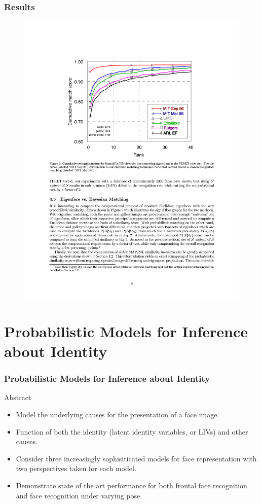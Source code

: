 \documentclass{beamer}
\begin{document}
\begin{frame}
\frametitle{Results}
\begin{figure}[H]
\centering
\includegraphics[height=\textheight, trim=1.6in 4.9in 1.6in 1.4in, clip]{Moghaddam11}
\end{figure}
\end{frame}

\section{Probabilistic Models for Inference about Identity}
\begin{frame}
\frametitle{Probabilistic Models for Inference about Identity}
\begin{block}{Abstract}
\begin{itemize}
\item Model the underlying causes for the presentation of a face image.
\pause
\item Function of both the identity (latent identity variables, or LIVs) and other causes.
\pause
\item Consider three increasingly sophisiticated models for face representation with two perspectives taken for each model.
\pause
\item Demonstrate state of the art performance for both frontal face recognition and face recognition under varying pose.
\end{itemize}
\end{block}
\end{frame}
\end{document}
